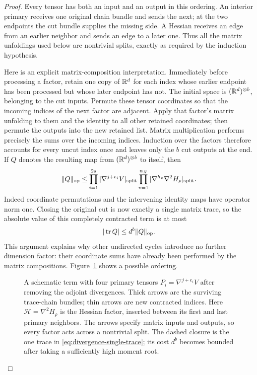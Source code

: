 \begin{proof}
Every tensor has both an input and an output in this ordering.
An interior primary receives one original chain bundle and sends the
next; at the two endpoints the cut bundle supplies the missing side.
A Hessian receives an edge from an earlier neighbor and sends an edge
to a later one.  Thus all the matrix unfoldings used below are
nontrivial splits, exactly as required by the induction hypothesis.

Here is an explicit matrix-composition interpretation.  Immediately
before processing a factor, retain one copy of $\mathbb R^d$ for each index
whose earlier endpoint has been processed but whose later endpoint
has not.  The initial space is $(\mathbb R^d)^{\otimes b}$, belonging to
the cut inputs.  Permute these tensor coordinates so that the incoming
indices of the next factor are adjacent.  Apply that factor's matrix
unfolding to them and the identity to all other retained coordinates;
then permute the outputs into the new retained list.  Matrix
multiplication performs precisely the sums over the incoming indices.
Induction over the factors therefore accounts for every uncut index
once and leaves only the $b$ cut outputs at the end.  If $Q$ denotes
the resulting map from $(\mathbb R^d)^{\otimes b}$ to itself, then
\[
 \|Q\|_{\mathrm{op}}
 \le\prod_{i=1}^{2s}|\nabla^{j+e_i}V|_{\mathrm{split}}
      \prod_{v=1}^{n_H}|\nabla^{h_v}\nabla^2H_\rho|_{\mathrm{split}}.
\]
Indeed coordinate permutations and the intervening identity maps have
operator norm one.  Closing the original cut is now exactly a single
matrix trace, so the absolute value of this completely contracted term
is at most
\begin{equation}\label{eq:divergence-single-trace}
 |\operatorname{tr} Q|\le d^b\|Q\|_{\mathrm{op}}.
\end{equation}
This argument explains why other undirected cycles introduce no further
dimension factor: their coordinate sums have already been performed
by the matrix compositions.  Figure~\ref{fig:tensor-cut} shows a
possible ordering.

\begin{figure}[tb]
\centering

\caption{A schematic term with four primary tensors
$P_i=\nabla^{j+e_i}V$ after removing the adjoint divergences.  Thick arrows are the surviving trace-chain
bundles; thin arrows are new contracted indices.  Here
$\mathcal H=\nabla^2H_\rho$ is the Hessian factor, inserted
between its first and last primary neighbors.  The arrows specify matrix inputs and outputs, so every factor
acts across a nontrivial split.  The dashed closure is the one trace
in \eqref{eq:divergence-single-trace}; its cost $d^b$ becomes bounded
after taking a sufficiently high moment root.}
\label{fig:tensor-cut}
\end{figure}


\end{proof}
